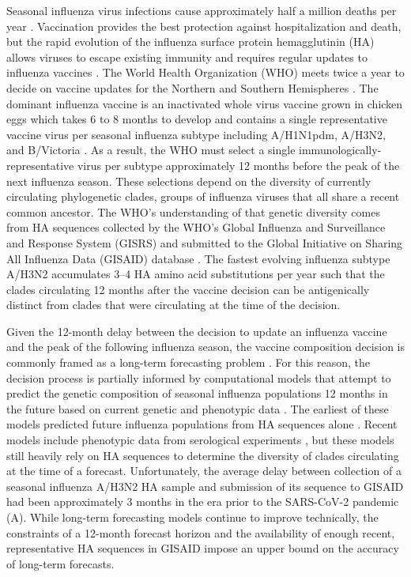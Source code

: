 \documentclass[9pt,lineno]{elife}
\begin{document}
Seasonal influenza virus infections cause approximately half a million deaths per year \citep{flufactsheet}.
Vaccination provides the best protection against hospitalization and death, but the rapid evolution of the influenza surface protein hemagglutinin (HA) allows viruses to escape existing immunity and requires regular updates to influenza vaccines \citep{Petrova2018}.
The World Health Organization (WHO) meets twice a year to decide on vaccine updates for the Northern and Southern Hemispheres \citep{Morris2018}.
The dominant influenza vaccine is an inactivated whole virus vaccine grown in chicken eggs \citep{Wong2013} which takes 6 to 8 months to develop and contains a single representative vaccine virus per seasonal influenza subtype including A/H1N1pdm, A/H3N2, and B/Victoria \citep{Morris2018}.
As a result, the WHO must select a single immunologically-representative virus per subtype approximately 12 months before the peak of the next influenza season.
These selections depend on the diversity of currently circulating phylogenetic clades, groups of influenza viruses that all share a recent common ancestor.
The WHO's understanding of that genetic diversity comes from HA sequences collected by the WHO's Global Influenza and Surveillance and Response System (GISRS) \citep{Hay2018} and submitted to the Global Initiative on Sharing All Influenza Data (GISAID) database \citep{gisaid}.
The fastest evolving influenza subtype A/H3N2 accumulates 3--4 HA amino acid substitutions per year \citep{Smith2004} such that the clades circulating 12 months after the vaccine decision can be antigenically distinct from clades that were circulating at the time of the decision.

Given the 12-month delay between the decision to update an influenza vaccine and the peak of the following influenza season, the vaccine composition decision is commonly framed as a long-term forecasting problem \citep{Lassig2017}.
For this reason, the decision process is partially informed by computational models that attempt to predict the genetic composition of seasonal influenza populations 12 months in the future based on current genetic and phenotypic data \citep{Morris2018}.
The earliest of these models predicted future influenza populations from HA sequences alone \citep{Luksza:2014hj,Neher:2014eu,Steinbruck2014}.
Recent models include phenotypic data from serological experiments \citep{Morris2018,Huddleston2020,Meijers2023,Meijers2024}, but these models still heavily rely on HA sequences to determine the diversity of clades circulating at the time of a forecast.
Unfortunately, the average delay between collection of a seasonal influenza A/H3N2 HA sample and submission of its sequence to GISAID had been approximately 3 months in the era prior to the SARS-CoV-2 pandemic (A).
While long-term forecasting models continue to improve technically, the constraints of a 12-month forecast horizon and the availability of enough recent, representative HA sequences in GISAID impose an upper bound on the accuracy of long-term forecasts.
\end{document}
